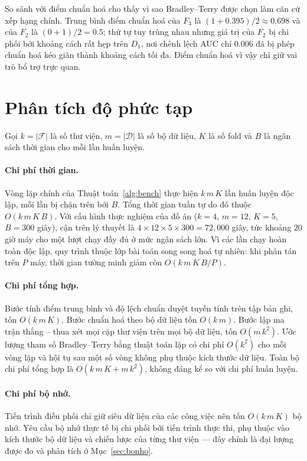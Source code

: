 \begin{vidu}
So sánh với điểm chuẩn hoá cho thấy vì sao Bradley--Terry được chọn làm căn cứ
xếp hạng chính. Trung bình điểm chuẩn hoá của $F_3$ là
$(1 + 0.395)/2 \approx 0.698$ và của $F_2$ là $(0 + 1)/2 = 0.5$; thứ tự tuy trùng
nhau nhưng giá trị của $F_2$ bị chi phối bởi khoảng cách rất hẹp trên $D_1$, nơi
chênh lệch AUC chỉ $0.006$ đã bị phép chuẩn hoá kéo giãn thành khoảng cách tối đa.
Điểm chuẩn hoá vì vậy chỉ giữ vai trò bổ trợ trực quan.
\end{vidu}

\section{Phân tích độ phức tạp}
\label{sec:dophuctap}
Gọi $k = |\mathcal{F}|$ là số thư viện, $m = |\mathcal{D}|$ là số bộ dữ liệu, $K$
là số fold và $B$ là ngân sách thời gian cho mỗi lần huấn luyện.

\paragraph{Chi phí thời gian.} Vòng lặp chính của Thuật toán~\ref{alg:bench} thực
hiện $k\,m\,K$ lần huấn luyện độc lập, mỗi lần bị chặn trên bởi $B$. Tổng thời
gian tuần tự do đó thuộc $O(k\,m\,K\,B)$. Với cấu hình thực nghiệm của đồ án
($k = 4$, $m = 12$, $K = 5$, $B = 300$ giây), cận trên lý thuyết là
$4 \times 12 \times 5 \times 300 = 72{,}000$ giây, tức khoảng $20$ giờ máy cho một
lượt chạy đầy đủ ở mức ngân sách lớn. Vì các lần chạy hoàn toàn độc lập, quy trình
thuộc lớp bài toán song song hoá tự nhiên: khi phân tán trên $P$ máy, thời gian
tường minh giảm còn $O(k\,m\,K\,B/P)$.

\paragraph{Chi phí tổng hợp.} Bước tính điểm trung bình và độ lệch chuẩn duyệt
tuyến tính trên tập bản ghi, tốn $O(k\,m\,K)$. Bước chuẩn hoá theo bộ dữ liệu tốn
$O(k\,m)$. Bước lập ma trận thắng -- thua xét mọi cặp thư viện trên mọi bộ dữ liệu,
tốn $O(m\,k^2)$. Ước lượng tham số Bradley--Terry bằng thuật toán lặp có chi phí
$O(k^2)$ cho mỗi vòng lặp và hội tụ sau một số vòng không phụ thuộc kích thước dữ
liệu. Toàn bộ chi phí tổng hợp là $O(k\,m\,K + m\,k^2)$, không đáng kể so với chi
phí huấn luyện.

\paragraph{Chi phí bộ nhớ.} Tiến trình điều phối chỉ giữ siêu dữ liệu của các
công việc nên tốn $O(k\,m\,K)$ bộ nhớ. Yêu cầu bộ nhớ thực tế bị chi phối bởi
tiến trình thực thi, phụ thuộc vào kích thước bộ dữ liệu và chiến lược của từng
thư viện --- đây chính là đại lượng được đo và phân tích ở
Mục~\ref{sec:bonho}.

